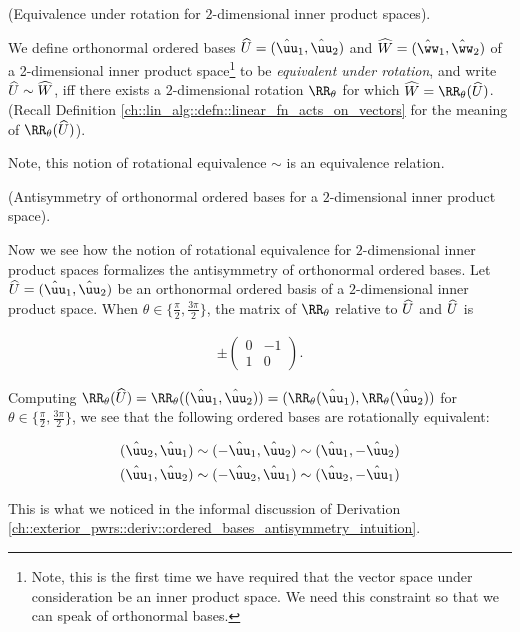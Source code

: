\begin{defn}
    (Equivalence under rotation for $2$-dimensional inner product spaces).

    We define orthonormal ordered bases $\hU = (\huu_1, \huu_2)$ and $\hW = (\hww_1, \hww_2)$ of a 2-dimensional inner product space\footnote{Note, this is the first time we have required that the vector space under consideration be an inner product space. We need this constraint so that we can speak of orthonormal bases.} to be \textit{equivalent under rotation}, and write $\widehat{U} \sim \widehat{W}$, iff there exists a $2$-dimensional rotation $\RR_\theta$ for which $\hW = \RR_\theta(\hU)$. (Recall Definition \ref{ch::lin_alg::defn::linear_fn_acts_on_vectors} for the meaning of $\RR_\theta(\hU)$).

    Note, this notion of rotational equivalence $\sim$ is an equivalence relation.
\end{defn}

\begin{theorem}
    \label{ch::exterior_pwrs::thm::antisymmetry_ordered_bases_2_dimensions}

    (Antisymmetry of orthonormal ordered bases for a $2$-dimensional inner product space).
    
    Now we see how the notion of rotational equivalence for $2$-dimensional inner product spaces formalizes the antisymmetry of orthonormal ordered bases. Let $\hU = (\huu_1, \huu_2)$ be an orthonormal ordered basis of a $2$-dimensional inner product space. When $\theta \in \{\frac{\pi}{2}, \frac{3\pi}{2} \}$, the matrix of $\RR_\theta$ relative to $\widehat{U}$ and $\widehat{U}$ is
    
    \begin{align*}
        \pm
        \begin{pmatrix}
            0 & -1 \\
            1 & 0
        \end{pmatrix}.
    \end{align*}
    
    Computing $\RR_\theta(\hU) = \RR_\theta((\huu_1, \huu_2)) = (\RR_\theta(\huu_1), \RR_\theta(\huu_2))$ for $\theta \in \{\frac{\pi}{2}, \frac{3\pi}{2}\}$, we see that the following ordered bases are rotationally equivalent:
    
    \begin{align*}
        (\huu_2, \huu_1 ) &\sim (-\huu_1, \huu_2) \sim (\huu_1, - \huu_2) \\
        (\huu_1, \huu_2) &\sim (-\huu_2, \huu_1) \sim (\huu_2, -\huu_1)
    \end{align*}

    This is what we noticed in the informal discussion of Derivation \ref{ch::exterior_pwrs::deriv::ordered_bases_antisymmetry_intuition}.
\end{theorem}

